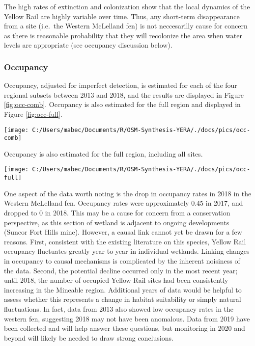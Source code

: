 \documentclass[11pt,]{article}
\begin{document}
The high rates of extinction and colonization show that the local
dynamics of the Yellow Rail are highly variable over time. Thus, any
short-term disappearance from a site (i.e.~the Western McLelland fen) is
not neccesarilly cause for concern as there is reasonable probability
that they will recolonize the area when water levels are appropriate
(see occupancy discussion below).

\subsubsection{Occupancy}\label{occupancy}

Occupancy, adjusted for imperfect detection, is estimated for each of
the four regional subsets between 2013 and 2018, and the results are
displayed in Figure \ref{fig:occ-comb}. Occupancy is also estimated for
the full region and displayed in Figure \ref{fig:occ-full}.

\begin{center}\texttt{[image: C:/Users/mabec/Documents/R/OSM-Synthesis-YERA/./docs/pics/occ-comb]} \end{center}

Occupancy is also estimated for the full region, including all sites.

\begin{center}\texttt{[image: C:/Users/mabec/Documents/R/OSM-Synthesis-YERA/./docs/pics/occ-full]} \end{center}

One aspect of the data worth noting is the drop in occupancy rates in
2018 in the Western McLelland fen. Occupancy rates were approximately
0.45 in 2017, and dropped to 0 in 2018. This may be a cause for concern
from a conservation perspective, as this section of wetland is adjacent
to ongoing developments (Suncor Fort Hills mine). However, a causal link
cannot yet be drawn for a few reasons. First, consistent with the
existing literature on this species, Yellow Rail occupancy fluctuates
greatly year-to-year in individual wetlands. Linking changes in
occupancy to causal mechanisms is complicated by the inherent noisiness
of the data. Second, the potential decline occurred only in the most
recent year; until 2018, the number of occupied Yellow Rail sites had
been consistently increasing in the Mineable region. Additional years of
data would be helpful to assess whether this represents a change in
habitat suitability or simply natural fluctuations. In fact, data from
2013 also showed low occupancy rates in the western fen, suggesting 2018
may not have been anomalous. Data from 2019 have been collected and will
help answer these questions, but monitoring in 2020 and beyond will
likely be needed to draw strong conclusions.
\end{document}
